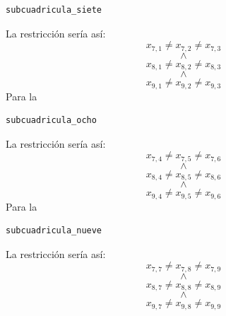 \documentclass[12pt]{article}
\begin{document}
\begin{itemize}
\begin{itemize}
\begin{verbatim}
subcuadricula_siete
\end{verbatim}
La restricción sería así:
\begin{equation*}
x_{7,1} \neq x_{7,2} \neq x_{7,3}
\end{equation*}
\begin{equation*}
\land
\end{equation*}
\begin{equation*}
x_{8,1} \neq x_{8,2} \neq x_{8,3}
\end{equation*}
\begin{equation*}
\land
\end{equation*}
\begin{equation*}
x_{9,1} \neq x_{9,2} \neq x_{9,3}
\end{equation*}
Para la
\begin{verbatim}
subcuadricula_ocho
\end{verbatim}
La restricción sería así:
\begin{equation*}
x_{7,4} \neq x_{7,5} \neq x_{7,6}
\end{equation*}
\begin{equation*}
\land
\end{equation*}
\begin{equation*}
x_{8,4} \neq x_{8,5} \neq x_{8,6}
\end{equation*}
\begin{equation*}
\land
\end{equation*}
\begin{equation*}
x_{9,4} \neq x_{9,5} \neq x_{9,6}
\end{equation*}
Para la
\begin{verbatim}
subcuadricula_nueve
\end{verbatim}
La restricción sería así:
\begin{equation*}
x_{7,7} \neq x_{7,8} \neq x_{7,9}
\end{equation*}
\begin{equation*}
\land
\end{equation*}
\begin{equation*}
x_{8,7} \neq x_{8,8} \neq x_{8,9}
\end{equation*}
\begin{equation*}
\land
\end{equation*}
\begin{equation*}
x_{9,7} \neq x_{9,8} \neq x_{9,9}
\end{equation*}
\end{itemize}
\end{itemize}
\end{document}
